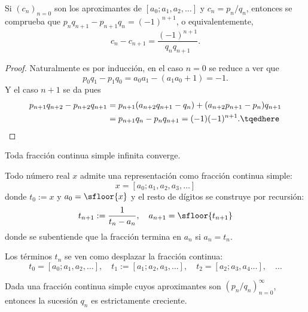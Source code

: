 \documentclass[teoria-numeros.tex]{subfiles}
\begin{document}
\begin{prop}\label{thm:approximants_closeness}
	Si $(c_n)_{n=0}$ son los aproximantes de $[a_0; a_1, a_2, \dots]$ y $c_n = p_n/q_n$, entonces se comprueba que $p_nq_{n+1} - p_{n+1}q_n = (-1)^{n+1}$,
	o equivalentemente,
	$$ c_n - c_{n+1} = \frac{(-1)^{n+1}}{q_nq_{n+1}}. $$
\end{prop}
\begin{proof}
	Naturalmente es por inducción, en el caso $n = 0$ se reduce a ver que
	$$ p_0q_1 - p_1q_0 = a_0a_1 - ( a_1a_0 + 1 ) = -1. $$
	Y el caso $n+1$ se da pues
	\begin{align}
		p_{n+1}q_{n+2} - p_{n+2}q_{n+1} &= p_{n+1}(a_{n+2}q_{n+1} - q_n) + (a_{n+2}p_{n+1} - p_n)q_{n+1} \notag \\
						&= p_{n+1}q_n - p_nq_{n+1} = (-1) (-1)^{n+1}. \tqedhere
	\end{align}
\end{proof}

\begin{cor}
	Toda fracción continua simple infinita converge.
\end{cor}

\begin{prop}\label{thm:real_simple_cont_frac_rep}
	Todo número real $x$ admite una representación como fracción continua simple:
	$$ x = [a_0; a_1, a_2, a_3, \dots] $$
	donde $t_0 := x$ y $a_0 = \sfloor{x}$ y el resto de dígitos se construye por recursión:
	$$ t_{n+1} :=  \frac{1}{t_n - a_n}, \quad a_{n+1} = \sfloor{t_{n+1}} $$
	donde se subentiende que la fracción termina en $a_n$ si $a_n = t_n$.
\end{prop}
Los términos $t_n$ se ven como desplazar la fracción continua:
$$ t_0 = [a_0; a_1, a_2, \dots], \quad t_1 := [a_1; a_2, a_3, \dots], \quad t_2 = [a_2; a_3, a_4 \dots], \quad \dots $$

\begin{lem}
	Dada una fracción continua simple cuyos aproximantes son $(p_n/q_n)_{n=0}^\infty$, entonces la sucesión $q_n$ es estrictamente creciente.
\end{lem}
\end{document}
